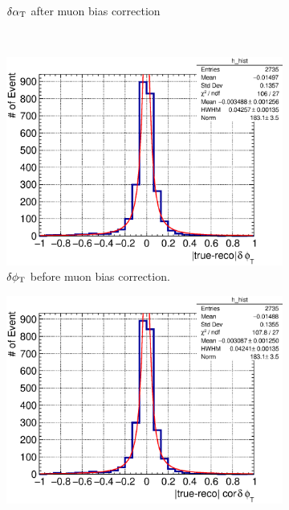 \begin{figure}
\begin{subfigure}[b]{\dbfigwid\textwidth}
               \caption{$\delta\alpha_\textrm{T}$ after muon bias correction}
               \label{subfig:esc-dalpha-afmu}
          \end{subfigure}         
          \\
          \begin{subfigure}[b]{\dbfigwid\textwidth}
               \centering
               \includegraphics[width=\textwidth]{figures/perf/tki/dphit_rat_hist_al14.eps}
               \caption{$\delta\phi_\textrm{T}$ before muon bias correction.}
               \label{subfig:esc-dphit-bfmu}
          \end{subfigure}
          \begin{subfigure}[b]{\dbfigwid\textwidth}
               \centering
               \includegraphics[width=\textwidth]{figures/perf/tki/cor_dphit_rat_hist_al14.eps}

\end{subfigure}
\end{figure}

